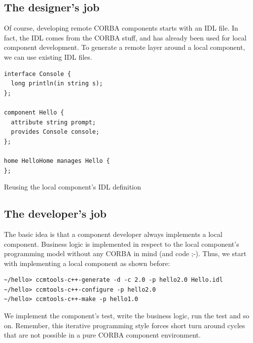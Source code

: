 \subsection{The designer's job}

Of course, developing remote CORBA components starts with an IDL file. 
In fact, the
IDL comes from the CORBA stuff, and has already been used for local component 
development. 
To generate a remote layer around a local component, we can use existing IDL
files.
  
\begin{Example}
\begin{minifbox}
\begin{small}
\begin{verbatim}
interface Console {
  long println(in string s);
};

component Hello {
  attribute string prompt;
  provides Console console;
};

home HelloHome manages Hello {
};
\end{verbatim}
\end{small}
\end{minifbox}
\caption{Reusing the local component's IDL definition}
\label{example:one-component-idl}
\end{Example}


\subsection{The developer's job}

The basic idea is that a component developer always implements a local component.
Business logic is implemented in respect to the local component's programming
model without any CORBA in mind (and code ;-).
Thus, we start with implementing a local component as shown before:
\begin{small}
\begin{verbatim}
~/hello> ccmtools-c++-generate -d -c 2.0 -p hello2.0 Hello.idl
~/hello> ccmtools-c++-configure -p hello2.0
~/hello> ccmtools-c++-make -p hello1.0
\end{verbatim}
\end{small}

We implement the component's test, write the business logic, run the test and so on.
Remember, this iterative programming style forces short turn around cycles that are
not possible in a pure CORBA component environment.



